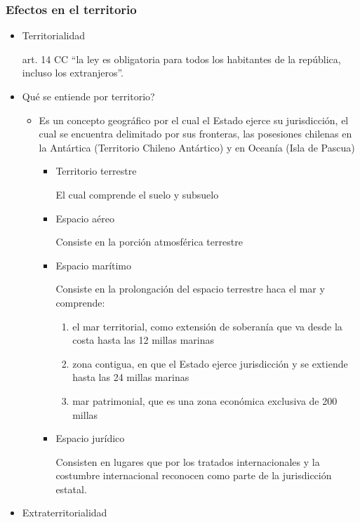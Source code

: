 \documentclass[]{article}
\providecommand{\tightlist}{%
  \setlength{\itemsep}{0pt}\setlength{\parskip}{0pt}}
\begin{document}
\hypertarget{efectos-en-el-territorio}{%
\subsubsection{Efectos en el
territorio}\label{efectos-en-el-territorio}}

\begin{itemize}
\item
  Territorialidad

  art. 14 CC ``la ley es obligatoria para todos los habitantes de la
  república, incluso los extranjeros''.
\item
  Qué se entiende por territorio?

  \begin{itemize}
  \tightlist
  \item
    Es un concepto geográfico por el cual el Estado ejerce su
    jurisdicción, el cual se encuentra delimitado por sus fronteras, las
    posesiones chilenas en la Antártica (Territorio Chileno Antártico) y
    en Oceanía (Isla de Pascua)

    \begin{itemize}
    \item
      Territorio terrestre

      El cual comprende el suelo y subsuelo
    \item
      Espacio aéreo

      Consiste en la porción atmosférica terrestre
    \item
      Espacio marítimo

      Consiste en la prolongación del espacio terrestre haca el mar y
      comprende:

      \begin{enumerate}
      \def\labelenumi{\arabic{enumi}.}
      \tightlist
      \item
        el mar territorial, como extensión de soberanía que va desde la
        costa hasta las 12 millas marinas
      \item
        zona contigua, en que el Estado ejerce jurisdicción y se
        extiende hasta las 24 millas marinas
      \item
        mar patrimonial, que es una zona económica exclusiva de 200
        millas
      \end{enumerate}
    \item
      Espacio jurídico

      Consisten en lugares que por los tratados internacionales y la
      costumbre internacional reconocen como parte de la jurisdicción
      estatal.
    \end{itemize}
  \end{itemize}
\item
  Extraterritorialidad


\end{itemize}
\end{document}
